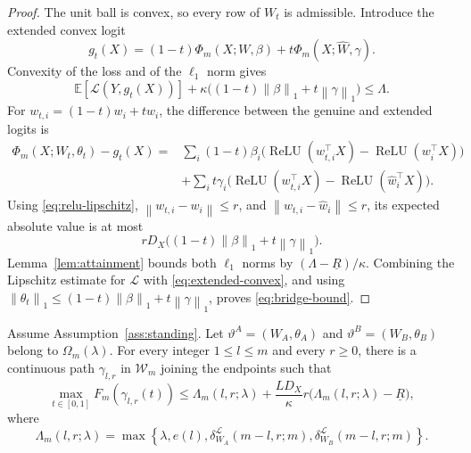 \documentclass[smallextended,envcountsect]{svjour3}
\newcommand{\relu}{\operatorname{ReLU}}
\newcommand{\E}{\mathbb{E}}
\newcommand{\norm}[1]{\left\lVert #1 \right\rVert}
\begin{document}
\begin{proof}
The unit ball is convex, so every row of $W_t$ is admissible. Introduce the extended convex logit
\[
g_t(X)=(1-t)\Phi_m(X;W,\beta)
+t\Phi_m(X;\widehat W,\gamma).
\]
Convexity of the loss and of the $\ell_1$ norm gives
\begin{equation}
\E[\mathcal L(Y,g_t(X))]
+\kappa\big((1-t)\norm{\beta}_1+t\norm{\gamma}_1\big)
\le\Lambda.
\label{eq:extended-convex}
\end{equation}
For $w_{t,i}=(1-t)w_i+t\hat w_i$, the difference between the genuine and extended logits is
\begin{align*}
\Phi_m(X;W_t,\theta_t)-g_t(X)
={}&\sum_i(1-t)\beta_i
\bigl(\relu(w_{t,i}^\top X)-\relu(w_i^\top X)\bigr)\\
&+\sum_i t\gamma_i
\bigl(\relu(w_{t,i}^\top X)-\relu(\hat w_i^\top X)\bigr).
\end{align*}
Using \eqref{eq:relu-lipschitz}, $\norm{w_{t,i}-w_i}\le r$, and $\norm{w_{t,i}-\hat w_i}\le r$, its expected absolute value is at most
\[
rD_X\big((1-t)\norm{\beta}_1+t\norm{\gamma}_1\big).
\]
Lemma~\ref{lem:attainment} bounds both $\ell_1$ norms by $(\Lambda-\underline R)/\kappa$. Combining the Lipschitz estimate for $\mathcal L$ with \eqref{eq:extended-convex}, and using $\norm{\theta_t}_1\le(1-t)\norm{\beta}_1+t\norm{\gamma}_1$, proves \eqref{eq:bridge-bound}.
\end{proof}

\begin{theorem}\label{thm:finite}
Assume Assumption~\ref{ass:standing}. Let $\vartheta^A=(W_A,\theta_A)$ and $\vartheta^B=(W_B,\theta_B)$ belong to $\Omega_m(\lambda)$. For every integer $1\le l\le m$ and every $r\ge0$, there is a continuous path $\gamma_{l,r}$ in $\mathcal W_m$ joining the endpoints such that
\begin{equation}
\max_{t\in[0,1]}F_m(\gamma_{l,r}(t))
\le
\Lambda_m(l,r;\lambda)
+\frac{LD_X}{\kappa}r
\bigl(\Lambda_m(l,r;\lambda)-\underline R\bigr),
\label{eq:finite-bound}
\end{equation}
where
\begin{equation}
\Lambda_m(l,r;\lambda)
=\max\!\left\{
\lambda,
e(l),
\delta_{W_A}^{\mathcal L}(m-l,r;m),
\delta_{W_B}^{\mathcal L}(m-l,r;m)
\right\}.
\label{eq:Lambda}
\end{equation}
\end{theorem}
\end{document}
